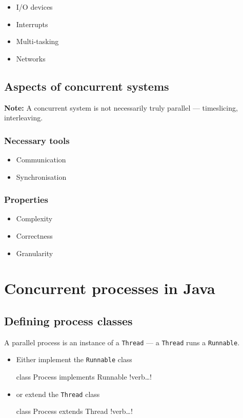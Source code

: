 \documentclass{article}
\begin{document}
\begin{itemize}
\item I/O devices
\item Interrupts
\item Multi-tasking
\item Networks
\end{itemize}


\subsection{Aspects of concurrent systems}

{\bf Note:} A concurrent system is not necessarily truly parallel --- timeslicing,
interleaving.

\subsubsection{Necessary tools}
\begin{itemize}
\item Communication
\item Synchronisation
\end{itemize}

\subsubsection{Properties}
\begin{itemize}
\item Complexity
\item Correctness
\item Granularity
\end{itemize}


\section{Concurrent processes in Java}
\subsection{Defining process classes}
A parallel process is an instance of a {\tt Thread} --- a {\tt Thread}
runs a {\tt Runnable}.
\begin{itemize}
\item Either implement the {\tt Runnable} class
\begin{flushleft}
class Process implements Runnable {!verb\ldots!}
\EndSystem
\end{flushleft}
\item or extend the {\tt Thread} class
\begin{flushleft}
class Process extends Thread {!verb\ldots!}
\EndSystem
\end{flushleft}
\end{itemize}
\end{document}
